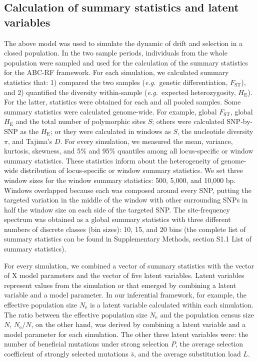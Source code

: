 \documentclass[a4paper, 12pt]{article}
\begin{document}
\subsection*{Calculation of summary statistics and latent variables}

The above model was used to simulate the dynamic of drift and selection in a closed population. In the two sample periods, individuals from the whole population were sampled and used for the calculation of the summary statistics for the ABC-RF framework. For each simulation, we calculated summary statistics that: 1) compared the two samples (\textit{e.g.}\ genetic differentiation, $F_{\mathrm{ST}}$), and 2) quantified the diversity within-sample (\textit{e.g.}\ expected heterozygosity, $H_{\mathrm{E}}$). For the latter, statistics were obtained for each and all pooled samples. Some summary statistics were calculated genome-wide. For example, global $F_{\mathrm{ST}}$, global $H_{\mathrm{E}}$ and the total number of polymorphic sites $S$; others were calculated SNP-by-SNP as the $H_{\mathrm{E}}$; or they were calculated in windows as $S$, the nucleotide diversity $\pi$, and Tajima's $D$. For every simulation, we measured the mean, variance, kurtosis, skewness, and 5\% and 95\% quantiles among all locus-specific or window summary statistics. These statistics inform about the heterogeneity of genome-wide distribution of locus-specific or window summary statistics. We set three window sizes for the window summary statistics: 500, 5,000, and 10,000 bp. Windows overlapped because each was composed around every SNP, putting the targeted variation in the middle of the window with other surrounding SNPs in half the window size on each side of the targeted SNP. The site-frequency spectrum was obtained as a global summary statistics with three different numbers of discrete classes (bin sizes): 10, 15, and 20 bins (the complete list of summary statistics can be found in Supplementary Methods, section S1.1 List of summary statistics).

For every simulation, we combined a vector of summary statistics with the vector of X model parameters and the vector of five latent variables. Latent variables represent values from the simulation or that emerged by combining a latent variable and a model parameter. In our inferential framework, for example, the effective population size $N_{\mathrm{e}}$ is a latent variable calculated within each simulation. The ratio between the effective population size $N_{\mathrm{e}}$ and the population census size $N$, $N_{\mathrm{e}}/N$, on the other hand, was derived by combining a latent variable and a model parameter for each simulation. The other three latent variables were: the number of beneficial mutations under strong selection $P$, the average selection coefficient of strongly selected mutations $\bar{s}$, and the average substitution load $L$.
\end{document}
